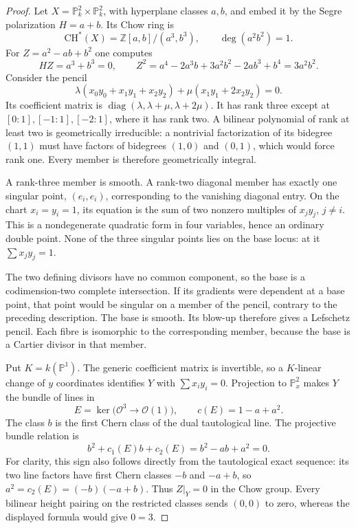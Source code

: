 \begin{proof}
Let $X=\mathbb P^2_k\times\mathbb P^2_k$, with hyperplane classes $a,b$,
and embed it by the Segre polarization $H=a+b$.  Its Chow ring is
\[
 \mathrm{CH}^*(X)=\mathbb Z[a,b]/(a^3,b^3),\qquad \deg(a^2b^2)=1.
\]
For $Z=a^2-ab+b^2$ one computes
\[
 HZ=a^3+b^3=0,\qquad
 Z^2=a^4-2a^3b+3a^2b^2-2ab^3+b^4=3a^2b^2.
\]
Consider the pencil
\[
 \lambda(x_0y_0+x_1y_1+x_2y_2)
       +\mu(x_1y_1+2x_2y_2)=0.
\]
Its coefficient matrix is
$\operatorname{diag}(\lambda,\lambda+\mu,\lambda+2\mu)$.  It has rank
three except at $[0:1],[-1:1],[-2:1]$, where it has rank two.  A bilinear
polynomial of rank at least two is geometrically irreducible: a nontrivial
factorization of its bidegree $(1,1)$ must have factors of bidegrees $(1,0)$
and $(0,1)$, which would force rank one.  Every member is therefore
geometrically integral.

A rank-three member is smooth.  A rank-two diagonal member has exactly one
singular point, $(e_i,e_i)$, corresponding to the vanishing diagonal entry.
On the chart $x_i=y_i=1$, its equation is the sum of two nonzero multiples
of $x_jy_j$, $j\ne i$.  This is a nondegenerate quadratic form in four
variables, hence an ordinary double point.  None of the three singular
points lies on the base locus: at it $\sum x_jy_j=1$.

The two defining divisors have no common component, so the base is a
codimension-two complete intersection.  If its gradients were dependent
at a base point, that point would be singular on a member of the pencil,
contrary to the preceding description.  The base is smooth.  Its blow-up
therefore gives a Lefschetz pencil.  Each fibre is isomorphic to the
corresponding member, because the base is a Cartier divisor in that member.

Put $K=k(\mathbb P^1)$.  The generic coefficient matrix is invertible, so
a $K$-linear change of $y$ coordinates identifies $Y$ with
$\sum x_i y_i=0$.  Projection to $\mathbb P^2_x$ makes $Y$ the bundle of
lines in
\[
 E=\ker\bigl(\mathcal O^3\longrightarrow\mathcal O(1)\bigr),\qquad
 c(E)=1-a+a^2.
\]
The class $b$ is the first Chern class of the dual tautological line.
The projective bundle relation is
\[
 b^2+c_1(E)b+c_2(E)=b^2-ab+a^2=0.
\]
For clarity, this sign also follows directly from the tautological exact
sequence: its two line factors have first Chern classes $-b$ and $-a+b$,
so $a^2=c_2(E)=(-b)(-a+b)$.  Thus $Z|_Y=0$ in the Chow group.  Every
bilinear height pairing on the restricted classes sends $(0,0)$ to zero,
whereas the displayed formula would give $0=3$.
\end{proof}

